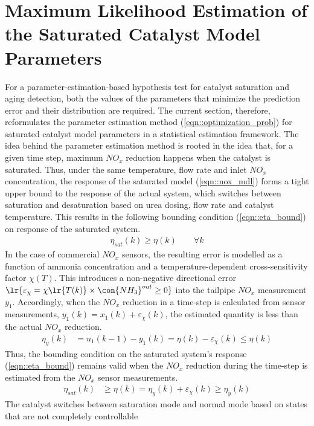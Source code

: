 \section{Maximum Likelihood Estimation of the Saturated Catalyst Model Parameters}
For a parameter-estimation-based hypothesis test for catalyst saturation and aging detection, both the values of the parameters that minimize the prediction error and their distribution are required. The current section, therefore,
reformulates the parameter estimation method (\ref{eqn::optimization_prob}) for saturated catalyst model parameters in a
statistical estimation framework. The idea behind the parameter estimation method is rooted in the idea that, for a given time step, maximum $NO_x$ reduction happens when the catalyst is saturated. Thus,
under the same temperature, flow rate and inlet $NO_x$ concentration, the response of the saturated model
(\ref{eqn::nox_mdl}) forms a tight upper bound to the response of the actual system, which switches between saturation
and desaturation based on urea dosing, flow rate and catalyst temperature. This results in the following bounding
condition (\ref{eqn::eta_bound}) on response of the saturated system.
\begin{align}
        \eta_{sat}(k) \geq \eta(k) \qquad \forall k
        \label{eqn::eta_bound}
\end{align}
In the case of commercial $NO_x$ sensors, the resulting error is modelled as a function of ammonia concentration and a
temperature-dependent cross-sensitivity factor $\chi(T)$. This introduces a non-negative directional error
$\lr{\varepsilon_\chi= \chi\lr{T(k)} \times \con{NH_3}^{out}\geq 0}$ into the tailpipe $NO_x$ measurement $y_1$.
Accordingly, when the $NO_x$ reduction in a time-step is calculated from sensor measurements, $y_1(k) = x_1(k) +
\varepsilon_{\chi}(k)$, the estimated quantity is less than the actual $NO_x$ reduction.
\begin{align}
        \eta_y(k) &= u_1(k-1) - y_1(k) =  \eta(k) - \varepsilon_\chi(k) \leq \eta(k) \label{eqn::cross_meas}
\end{align}
Thus, the bounding condition on the saturated system's response (\ref{eqn::eta_bound}) remains valid when the $NO_x$ reduction during the time-step is estimated from the $NO_x$ sensor measurements.
\begin{align}
        \eta_{sat}(k) &\geq \eta(k) = \eta_y(k) + \varepsilon_\chi(k) \geq \eta_y(k) \label{eqn::eta_y_bound}
\end{align}
The catalyst switches between saturation mode and normal mode based on states that are not completely controllable
